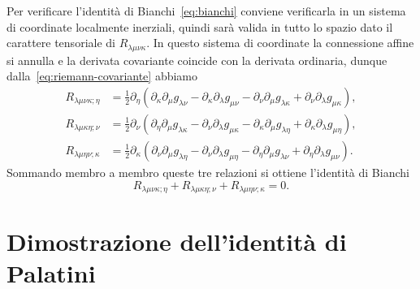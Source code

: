 Per verificare l'identità di
Bianchi~\eqref{eq:bianchi} conviene verificarla in un sistema di coordinate
localmente inerziali, quindi sarà valida in tutto lo spazio dato il carattere
tensoriale di $R_{\lambda\mu\nu\kappa}$.  In questo sistema di coordinate la
connessione affine si annulla e la derivata covariante coincide con la derivata
ordinaria, dunque dalla~\eqref{eq:riemann-covariante} abbiamo
\begin{subequations}
  \begin{align}
    R_{\lambda\mu\nu\kappa;\eta} &=
    \frac{1}{2} \partial_{\eta}(\partial_{\kappa} \partial_{\mu} g_{\lambda\nu}
    - \partial_{\kappa} \partial_{\lambda} g_{\mu\nu}
    - \partial_{\nu} \partial_{\mu} g_{\lambda\kappa}
    + \partial_{\nu} \partial_{\lambda} g_{\mu\kappa}), \\
    R_{\lambda\mu\kappa\eta;\nu} &=
    \frac{1}{2} \partial_{\nu}(\partial_{\eta} \partial_{\mu} g_{\lambda\kappa}
    - \partial_{\nu} \partial_{\lambda} g_{\mu\kappa}
    - \partial_{\kappa} \partial_{\mu} g_{\lambda\eta}
    + \partial_{\kappa} \partial_{\lambda} g_{\mu\eta}), \\
    R_{\lambda\mu\eta\nu;\kappa} &= \frac{1}{2} \partial_{\kappa}(\partial_{\nu}
    \partial_{\mu} g_{\lambda\eta} - \partial_{\nu} \partial_{\lambda}
    g_{\mu\eta} - \partial_{\eta} \partial_{\mu} g_{\lambda\nu}
    + \partial_{\eta} \partial_{\lambda} g_{\mu\nu}).
  \end{align}
\end{subequations}
Sommando membro a membro queste tre relazioni si ottiene l'identità di Bianchi
\begin{equation}
  R_{\lambda\mu\nu\kappa;\eta} + R_{\lambda\mu\kappa\eta;\nu} +
  R_{\lambda\mu\eta\nu;\kappa} = 0.
\end{equation}

\section{Dimostrazione dell'identità di Palatini}
\label{sec:dimostr-palatini}

